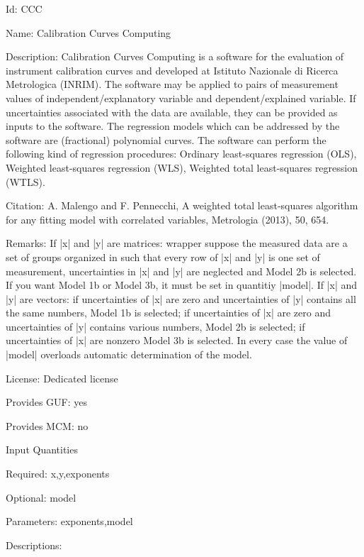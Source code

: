 \begin{tightdesc}
\item [Id:] CCC
\item [Name:] Calibration Curves Computing
\item [Description:] Calibration Curves Computing is a software for the evaluation of instrument calibration curves and developed at Istituto Nazionale di Ricerca Metrologica (INRIM). The software may be applied to pairs of measurement values of independent/explanatory variable and dependent/explained variable. If uncertainties associated with the data are available, they can be provided as inputs to the software. The regression models which can be addressed by the software are (fractional) polynomial curves. The software can perform the following kind of regression procedures: Ordinary least-squares regression (OLS), Weighted least-squares regression (WLS), Weighted total least-squares regression (WTLS).
\item [Citation:] A. Malengo and F. Pennecchi, A weighted total least-squares algorithm for any fitting model with correlated variables, Metrologia (2013), 50, 654.
\item [Remarks:] If |x| and |y| are matrices: wrapper suppose the measured data are a set of groups organized in such that every row of |x| and |y| is one set of measurement, uncertainties in |x| and |y| are neglected and Model 2b is selected. If you want Model 1b or Model 3b, it must be set in quantitiy |model|. If |x| and |y| are vectors: if uncertainties of |x| are zero and uncertainties of |y| contains all the same numbers, Model 1b is selected; if uncertainties of |x| are zero and uncertainties of |y| contains various numbers, Model 2b is selected; if uncertainties of |x| are nonzero Model 3b is selected. In every case the value of |model| overloads automatic determination of the model.
\item [License:] Dedicated license
\item [Provides GUF:] yes
\item [Provides MCM:] no
\item [Input Quantities] \rule{0em}{0em}
    \begin{tightdesc}
    \item [Required:] 
        \textsf{x},\enspace \textsf{y},\enspace \textsf{exponents}
    \item [Optional:] 
        \textsf{model}
    \item [Parameters:] 
        \textsf{exponents},\enspace \textsf{model}
    \item [Descriptions:] \rule{0em}{0em}

\end{tightdesc}
\end{tightdesc}
